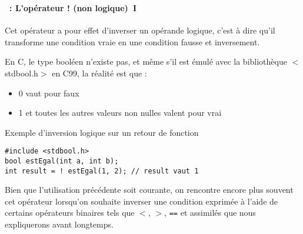 \begin{frame}[containsverbatim]
  \frametitle{\secname}
  \framesubtitle{\subsecname~: L'opérateur ! (non logique)~I} 

  Cet opérateur a pour effet d'inverser un opérande logique, c'est à dire qu'il transforme une condition vraie en une condition fausse et inversement.
  \vspace{0.3cm}
  \par
  En C, le type booléen n'existe pas, et même s'il est émulé avec la bibliothèque $<$stdbool.h$>$ en C99, la réalité est que :
  \begin{itemize}
    \item 0 vaut pour faux
    \item 1 et toutes les autres valeurs non nulles valent pour vrai
  \end{itemize}
  
  {\small\begin{exampleblock}{Exemple d'inversion logique sur un retour de fonction}
    \begin{verbatim}
#include <stdbool.h>
bool estEgal(int a, int b);
int result = ! estEgal(1, 2); // result vaut 1\end{verbatim} 
  \end{exampleblock}}
  \par
  Bien que l'utilisation précédente soit courante, on rencontre encore plus souvent cet opérateur lorsqu'on souhaite inverser une condition exprimée à l'aide de certains
  opérateurs binaires tels que $<$, $>$, \verb|==| et assimilés que nous expliquerons avant longtemps.
\end{frame}

